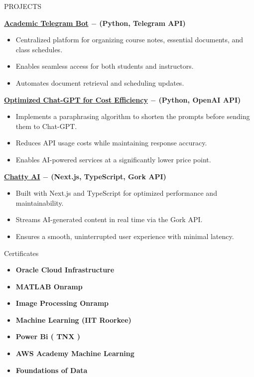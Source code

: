 \documentclass{resume} %
\begin{document}
\begin{rSection}{PROJECTS}
\vspace{-1.25em}
\item \textbf{\href{https://github.com/jackwaghan/Academic-Helper-TelegramBot}{Academic Telegram Bot} \(-\) (Python, Telegram API)}  
    \begin{itemize}
        \item Centralized platform for organizing course notes, essential documents, and class schedules.  
        \item Enables seamless access for both students and instructors.  
        \item Automates document retrieval and scheduling updates.  
    \end{itemize}  

\item \textbf{\href{https://github.com/jackwaghan/rapidapi}{Optimized Chat-GPT for Cost Efficiency} \(-\) (Python, OpenAI API)}  
    \begin{itemize}
        \item Implements a paraphrasing algorithm to shorten the prompts before sending them to Chat-GPT.  
        \item Reduces API usage costs while maintaining response accuracy.  
        \item Enables AI-powered services at a significantly lower price point.  
    \end{itemize}  

\item \textbf{\href{https://github.com/jackwaghan/Chatty-AI}{Chatty AI} \(-\) (Next.js, TypeScript, Gork API)}  
    \begin{itemize}
        \item Built with Next.js and TypeScript for optimized performance and maintainability.  
        \item Streams AI-generated content in real time via the Gork API.  
        \item Ensures a smooth, uninterrupted user experience with minimal latency.  
    \end{itemize}  
\end{rSection}


\begin{rSection}{Certificates} 
\begin{itemize}
\item \textbf{Oracle Cloud Infrastructure}
\item \textbf{MATLAB Onramp}
\item \textbf{Image Processing Onramp}
\item \textbf{Machine Learning (IIT Roorkee) }
\item \textbf{Power Bi ( TNX ) }
\item \textbf{AWS Academy Machine Learning}
\item \textbf{Foundations of Data }
\end{itemize}                  
\end{rSection}
\end{document}
